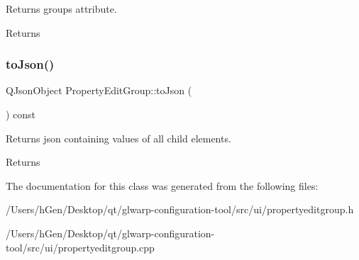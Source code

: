 Returns groups attribute. 

\begin{DoxyReturn}{Returns}

\end{DoxyReturn}
\mbox{\label{class_property_edit_group_a8465118b18404dc711408268f992dc67}} 
\subsubsection{\texorpdfstring{to\+Json()}{toJson()}}
{\footnotesize\ttfamily Q\+Json\+Object Property\+Edit\+Group\+::to\+Json (\begin{DoxyParamCaption}{ }\end{DoxyParamCaption}) const}



Returns json containing values of all child elements. 

\begin{DoxyReturn}{Returns}

\end{DoxyReturn}


The documentation for this class was generated from the following files\+:\begin{DoxyCompactItemize}
\item 
/\+Users/h\+Gen/\+Desktop/qt/glwarp-\/configuration-\/tool/src/ui/propertyeditgroup.\+h\item 
/\+Users/h\+Gen/\+Desktop/qt/glwarp-\/configuration-\/tool/src/ui/propertyeditgroup.\+cpp\end{DoxyCompactItemize}
